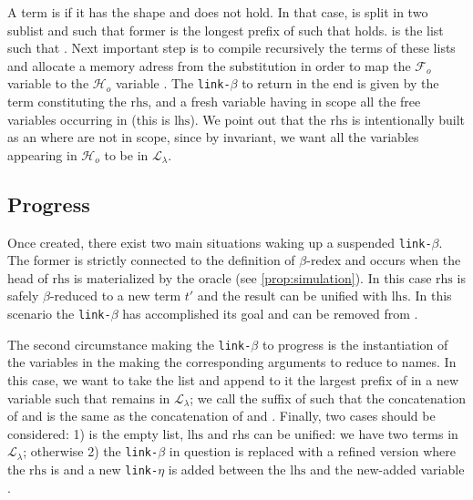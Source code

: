 \documentclass[sigconf,natbib=false,review]{acmart}
\newcommand{\llambda}{\ensuremath{\mathcal{L}_\lambda}\xspace}
\newcommand{\linkbeta}{\texttt{link-}\ensuremath{\beta}\xspace}
\newcommand{\linketa}{\texttt{link-}\ensuremath{\eta}\xspace}
\newcommand{\Fo}{\ensuremath{\mathcal{F}_{\!o}\xspace}} %
\newcommand{\Ho}{\ensuremath{\mathcal{H}_o}\xspace}
\newcommand{\lhs}{\ensuremath{\mathrm{lhs}}\xspace}
\newcommand{\rhs}{\ensuremath{\mathrm{rhs}}\xspace}
\begin{document}
A term is \maybebeta if it has the shape  and
 does not hold. In that case,  is split in two
sublist  and  such that former is the longest prefix of
 such that  holds.  is the list
such that . Next important step is to compile
recursively the terms of these lists and allocate a memory adress 
from the substitution in order to map the \Fo variable  to
the \Ho variable . The \linkbeta to return in the end is given
by the term  constituting the \rhs,
and a fresh variable  having in scope all the free variables occurring
in  (this is \lhs). We point out that the \rhs is intentionally
built as an  where  are not in scope, since by
invariant, we want all the variables appearing in \Ho to be in \llambda.

\subsection{Progress}

Once created, there exist two main situations waking up a suspended \linkbeta.
The former is strictly connected to the definition of $\beta$-redex and occurs
when the head of \rhs is materialized by the oracle (see
\cref{prop:simulation}). In this case \rhs is safely
$\beta$-reduced to a new term $t'$ and the result can be unified with \lhs. In
this scenario the \linkbeta has accomplished its goal and can be removed from
\linkStore.

The second circumstance making the \linkbeta to progress is the instantiation of
the variables in the  making the corresponding arguments to
reduce to names. In this case, we want to take the list  and
append to it the largest prefix of  in a new variable
 such that  remains in \llambda; we call
 the suffix of  such that the concatenation of
 and  is the same as the concatenation of
 and . Finally, two cases should be considered: 1)
 is the empty list, \lhs and rhs can be unified: we have two
terms in \llambda; otherwise 2) the \linkbeta in question is replaced with a
refined version where the \rhs is   and a new
\linketa is added between the \lhs and the new-added variable .
\end{document}
